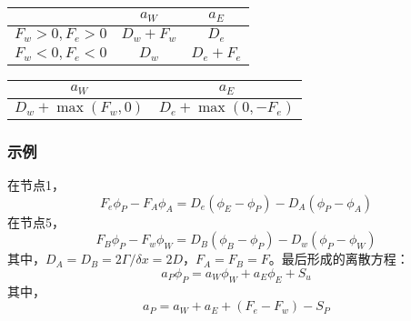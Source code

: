 \begin{table}[H]
  \begin{center}
  \label{TbFV_up_coefficient}
  \begin{tabular}{|c|c|c|}
    \hline
     & $a_{W}$ & $a_{E}$ 
    \\
    \hline
    $F_{w}>0, F_{e}>0$
            &
            $D_{w}+F_{w}$
            &
            $D_{e}$
    \\
    \hline
    $F_{w}<0, F_{e}<0$
            &
            $D_{w}$
            &
            $D_{e}+F_{e}$
    \\
    \hline
  \end{tabular}
  \end{center}
\end{table}
\begin{table}[H]
  \begin{center}
  \label{TbFV_up_ge_coefficient}
  \begin{tabular}{|c|c|}
    \hline
     $a_{W}$ & $a_{E}$ 
    \\
    \hline
    $D_{w}+\max(F_{w},0)$
            &
            $D_{e}+\max(0, -F_{e})$
    \\
    \hline
  \end{tabular}
  \end{center}
\end{table}

\subsubsection{示例}
在节点1，
\begin{equation}
  F_{e}\phi_{P}
  -
  F_{A}\phi_{A}
  =
  D_{e}(\phi_{E}-\phi_{P})
  -
  D_{A}(\phi_{P}-\phi_{A})
\end{equation}
在节点5，
\begin{equation}
  F_{B}\phi_{P}
  -
  F_{w}\phi_{W}
  =
  D_{B}(\phi_{B}-\phi_{P})
  -
  D_{w}(\phi_{P}-\phi_{W})
\end{equation}
其中，$D_{A}=D_{B}=2\Gamma/\delta x=2D$，$F_{A}=F_{B}=F$。最后形成的离散方程：
\begin{equation}
  a_{P}\phi_{P}
  =
  a_{W}\phi_{W}
  +
  a_{E}\phi_{E}
  +
  S_{u}
\end{equation}
其中，
\begin{equation}
  a_{P} = a_{W} + a_{E} + (F_{e}-F_{w}) - S_{P}
\end{equation}

